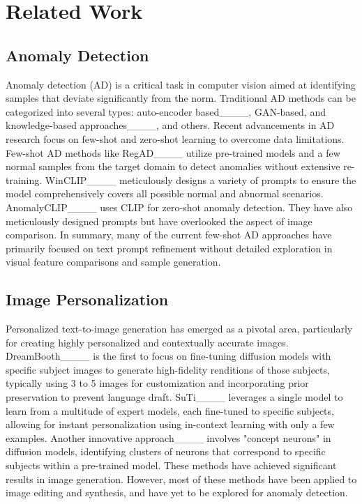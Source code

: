 \section{Related Work}
\label{related_work}
\subsection{Anomaly Detection}
Anomaly detection (AD) is a critical task in computer vision aimed at identifying samples that deviate significantly from the norm. Traditional AD methods can be categorized into several types:  auto-encoder based____, GAN-based, and knowledge-based approaches____, and others. Recent advancements in AD research focus on few-shot and zero-shot learning to overcome data limitations. Few-shot AD methods like RegAD____ utilize pre-trained models and a few normal samples from the target domain to detect anomalies without extensive re-training. WinCLIP____ meticulously designs a variety of prompts to ensure the model comprehensively covers all possible normal and abnormal scenarios. AnomalyCLIP____ uses CLIP for zero-shot anomaly detection. They have also meticulously designed prompts but have overlooked the aspect of image comparison. In summary, many of the current few-shot AD approaches have primarily focused on text prompt refinement without detailed exploration in visual feature comparisons and sample generation.

\subsection{Image Personalization}
Personalized text-to-image generation has emerged as a pivotal area, particularly for creating highly personalized and contextually accurate images. DreamBooth____ is the first to focus on fine-tuning diffusion models with specific subject images to generate high-fidelity renditions of those subjects, typically using 3 to 5 images for customization and incorporating prior preservation to prevent language draft. SuTi____ leverages a single model to learn from a multitude of expert models, each fine-tuned to specific subjects, allowing for instant personalization using in-context learning with only a few examples. Another innovative approach____ involves "concept neurons" in diffusion models, identifying clusters of neurons that correspond to specific subjects within a pre-trained model. These methods have achieved significant results in image generation. However, most of these methods have been applied to image editing and synthesis, and have yet to be explored for anomaly detection.

